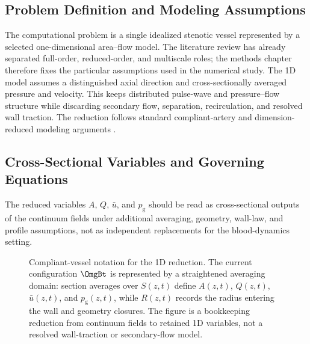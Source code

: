 \subsection{Problem Definition and Modeling Assumptions}
\label{subsec:methodology-problem-definition}
\label{subsec:selected-1d-forward-model}

The computational problem is a single idealized stenotic vessel represented by
a selected one-dimensional area--flow model. The literature review has already
separated full-order, reduced-order, and multiscale roles; the methods chapter
therefore fixes the particular assumptions used in the numerical study. The 1D
model assumes a distinguished axial direction and cross-sectionally averaged
pressure and velocity. This keeps distributed pulse-wave and pressure--flow
structure while discarding secondary flow, separation, recirculation, and
resolved wall traction.
The reduction follows standard compliant-artery and dimension-reduced modeling
arguments
\cite[Sec.~2, pp.~253--257]{FormaggiaEtAl2003OneDimensionalBloodFlow}
\cite[Ch.~3, Secs.~3.2 and~3.6]{KopplHelmig2023DimensionReducedModeling}
\cite[Sec.~3, pp.~24--26]{ShiEtAl2011BloodFlowModelReview}.

\subsection{Cross-Sectional Variables and Governing Equations}
\label{subsec:cross-sectional-variables-governing-equations}
\label{subsubsec:cross-sectional-reduction-selected-1d-model}

The reduced variables $A$, $Q$, $\bar u$, and $p_{\mathrm g}$ should be read as
cross-sectional outputs of the continuum fields under additional averaging,
geometry, wall-law, and profile assumptions, not as independent replacements for
the blood-dynamics setting.

\begin{figure}[!htb]
    \centering
    \captionsetup{aboveskip=2pt,belowskip=2pt}
    \caption{Compliant-vessel notation for the 1D reduction. The current
    configuration $\OmgBt$ is represented by a straightened averaging domain:
    section averages over $S(z,t)$ define $A(z,t)$, $Q(z,t)$, $\bar u(z,t)$,
    and $p_{\mathrm g}(z,t)$, while $R(z,t)$ records the radius entering the
    wall and geometry closures. The figure is a bookkeeping reduction from
    continuum fields to retained 1D variables, not a resolved wall-traction or
    secondary-flow model.}
    \label{fig:compliant-vessel-reduction}
\end{figure}


